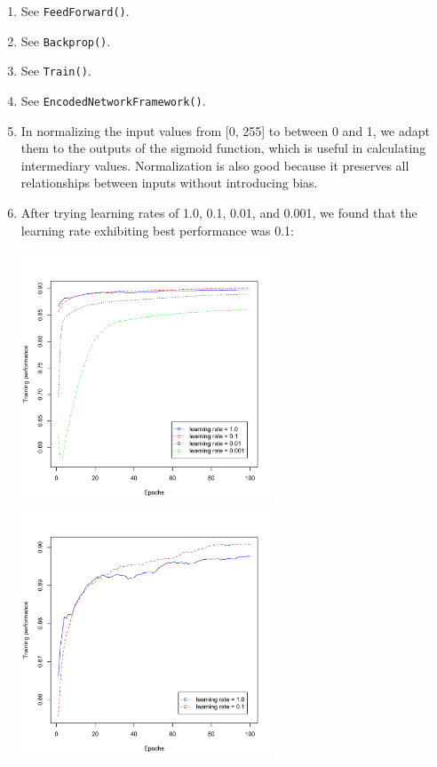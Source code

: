 \documentclass{article}
\begin{document}
\begin{enumerate}

\item %
See \texttt{FeedForward()}.

\item %
See \texttt{Backprop()}.

\item %
See \texttt{Train()}.

\item %
See \texttt{EncodedNetworkFramework()}.

\item %
In normalizing the input values from [0, 255] to between 0 and 1, we adapt them to the outputs of the sigmoid function, which is useful in calculating intermediary values. Normalization is also good because it preserves all relationships between inputs without introducing bias.
\newpage
\item %
After trying learning rates of 1.0, 0.1, 0.01, and 0.001, we found that the learning rate exhibiting best performance was 0.1:

\begin{center}
\includegraphics[width=75mm]{fig3.pdf} \includegraphics[width=75mm]{fig4.pdf}
\end{center}


\end{enumerate}
\end{document}

